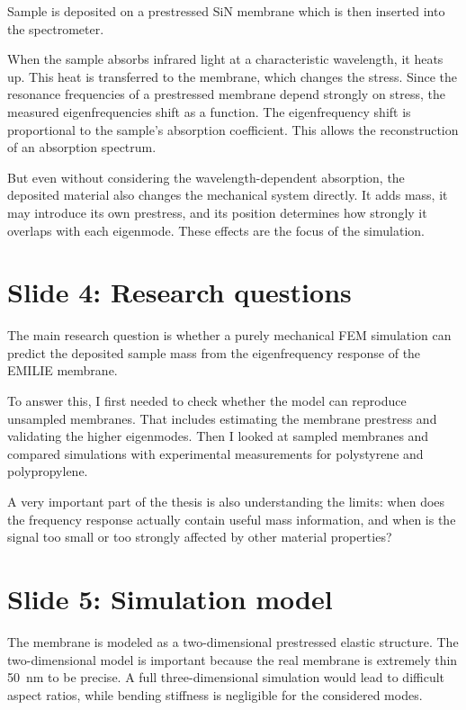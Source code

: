 \documentclass[11pt,a4paper]{article}
\begin{document}
Sample is deposited on a prestressed
SiN membrane which is then inserted into the spectrometer.

When the sample absorbs infrared light at a characteristic wavelength, it heats up. This heat is transferred to the membrane, which changes the stress. Since the resonance frequencies of a prestressed membrane depend strongly on stress, the measured eigenfrequencies shift as a function. The eigenfrequency shift is proportional to the sample's absorption coefficient. This allows the reconstruction of an absorption spectrum.

But even without considering the wavelength-dependent absorption, the deposited material also changes the mechanical system directly. It adds mass, it may introduce its own prestress, and its position determines how strongly it overlaps with each eigenmode. These effects are the focus of the simulation.

\section*{Slide 4: Research questions}

The main research question is whether a purely mechanical FEM simulation can predict the deposited sample mass from the eigenfrequency response of the EMILIE membrane.

To answer this, I first needed to check whether the model can reproduce unsampled membranes. That includes estimating the membrane prestress and validating the higher eigenmodes. Then I looked at sampled membranes and compared simulations with experimental measurements for polystyrene and polypropylene.

A very important part of the thesis is also understanding the limits: when does the frequency response actually contain useful mass information, and when is the signal too small or too strongly affected by other material properties?

\section*{Slide 5: Simulation model}

The membrane is modeled as a two-dimensional prestressed elastic structure. The two-dimensional model is important because the real membrane is extremely thin \SI{50}{\nano\meter} to be precise. A full three-dimensional simulation would lead to difficult aspect ratios, while bending stiffness is negligible for the considered modes.
\end{document}
